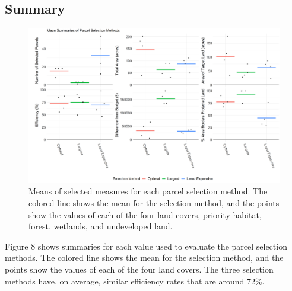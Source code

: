 \documentclass[12pt, stu, floatsintext,table]{apa7}
\begin{document}
\begin{table}[hbtp]
\caption{Summary of selected undeveloped parcels.} 
\end{table}
\subsection{Summary}
\begin{figure}[hbtp]
    \centering
    \includegraphics[width = \textwidth]{figures/summary.png}
    \caption{Means of selected measures for each parcel selection method. The colored line shows the mean for the selection method, and the points show the values of each of the four land covers, priority habitat, forest, wetlands, and undeveloped land. }
\end{figure}
Figure 8 shows summaries for each value used to evaluate the parcel selection methods. The colored line shows the mean for the selection method, and the points show the values of each of the four land covers.  
The three selection methods have, on average, similar efficiency rates that are around 72\%. 
\end{document}
